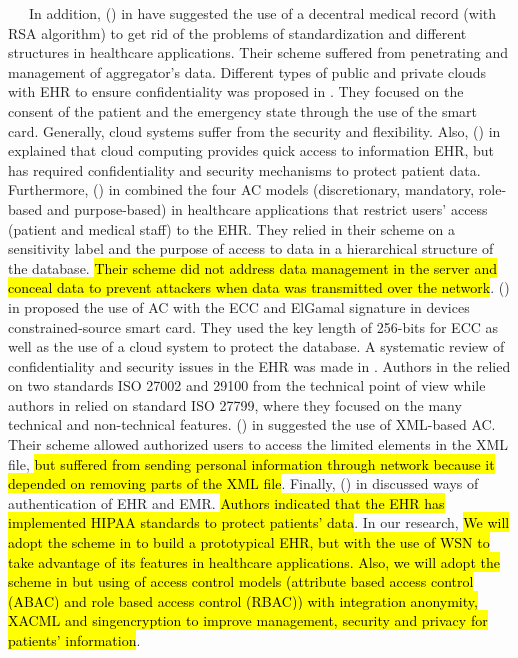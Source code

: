 \documentclass[a4paper,11pt]{article}
\DeclareRobustCommand{\hlyellow}[1]{{\sethlcolor{white}\hl{#1}}}
\begin{document}
~~~In addition, \citeauthor{pr55}(\citeyear{pr55}) in \cite{pr55} have suggested the use of a decentral medical record (with RSA algorithm) to get rid of the problems of standardization and different structures in healthcare applications. Their scheme suffered from penetrating and management of aggregator's data. Different types of public and private clouds with EHR to ensure confidentiality was proposed in \cite{pr39}. They focused on the consent of the patient and the emergency state through the use of the smart card. Generally, cloud systems suffer from the security and flexibility. Also, \citeauthor{pr50}(\citeyear{pr50}) in \cite{pr50} explained that cloud computing provides quick access to information EHR, but has required confidentiality and security mechanisms to protect patient data. Furthermore, \citeauthor{pr21}(\citeyear{pr21}) in \cite{pr21} combined the four AC models (discretionary, mandatory, role-based and purpose-based) in healthcare applications that restrict users' access (patient and medical staff) to the EHR. They relied in their scheme on a sensitivity label and the purpose of access to data in a hierarchical structure of the database. \hlyellow{Their scheme did not address data management in the server and conceal data to prevent attackers when data was transmitted over the network}. \citeauthor{pr26}(\citeyear{pr26}) in \cite{pr26} proposed the use of AC with the ECC and ElGamal signature in devices constrained-source smart card. They used the key length of 256-bits for ECC as well as the use of a cloud system to protect the database. A systematic review of confidentiality and security issues in the EHR was made in \cite{pr51,pr27}. Authors in the \cite{pr27} relied on two standards ISO 27002 and 29100 from the technical point of view while authors in \cite{pr51} relied on standard ISO 27799, where they focused on the many technical and non-technical features. \citeauthor{pr41}(\citeyear{pr41}) in \cite{pr41} suggested the use of XML-based AC. Their scheme allowed authorized users to access the limited elements in the XML file, \hlyellow{but suffered from sending personal information through network because it depended on removing parts of the XML file}. Finally, \citeauthor{pr53}(\citeyear{pr53}) in \cite{pr53} discussed ways of authentication of EHR and EMR. \hlyellow{Authors indicated that the EHR has implemented HIPAA standards to protect patients' data}. In our research, \hlyellow{ We will adopt the scheme in \cite{pr47} to build a prototypical EHR, but with the use of WSN to take advantage of its features in healthcare applications. Also, we will adopt the scheme in \cite{pr21} but using of access control models (attribute based access control (ABAC) and role based access control (RBAC)) with integration anonymity, XACML and singencryption to improve management, security and privacy for patients' information}.
\end{document}
